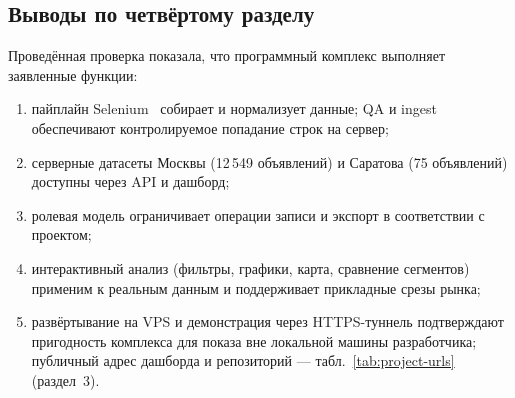 \subsection{Выводы по четвёртому разделу}

Проведённая проверка показала, что программный комплекс выполняет заявленные функции:
\begin{enumerate}
    \item пайплайн Selenium~\cite{selenium} собирает и нормализует данные; QA и ingest обеспечивают контролируемое попадание строк на сервер;
    \item серверные датасеты Москвы (12\,549 объявлений) и Саратова (75 объявлений) доступны через API и дашборд;
    \item ролевая модель ограничивает операции записи и экспорт в соответствии с проектом;
    \item интерактивный анализ (фильтры, графики, карта, сравнение сегментов) применим к реальным данным и поддерживает прикладные срезы рынка;
    \item развёртывание на VPS и демонстрация через HTTPS-туннель подтверждают пригодность комплекса для показа вне локальной машины разработчика; публичный адрес дашборда и репозиторий --- табл.~\ref{tab:project-urls} (раздел~3).
\end{enumerate}
